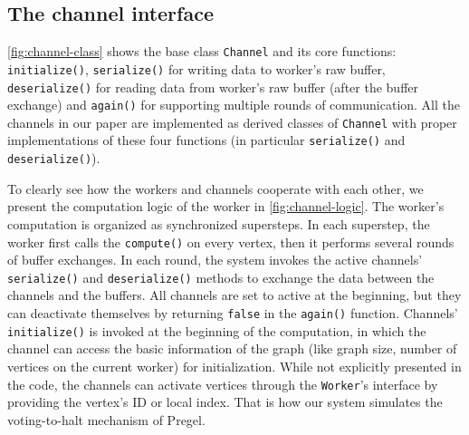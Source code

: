 \documentclass{sokendai_thesis} %
\begin{document}

\subsection{The channel interface}

\autoref{fig:channel-class} shows the base class \texttt{Channel} and its core functions: \texttt{initialize()}, \texttt{serialize()} for writing data to worker's raw buffer, \texttt{deserialize()} for reading data from worker's raw buffer (after the buffer exchange) and \texttt{again()} for supporting multiple rounds of communication.
All the channels in our paper are implemented as derived classes of \texttt{Channel} with proper implementations of these four functions (in particular \texttt{serialize()} and \texttt{deserialize()}).

To clearly see how the workers and channels cooperate with each other, we present the computation logic of the worker in \autoref{fig:channel-logic}.
The worker's computation is organized as synchronized supersteps.
In each superstep, the worker first calls the \texttt{compute()} on every vertex, then it performs several rounds of buffer exchanges.
In each round, the system invokes the active channels' \texttt{serialize()} and \texttt{deserialize()} methods to exchange the data between the channels and the buffers.
All channels are set to active at the beginning, but they can deactivate themselves by returning \texttt{false} in the \texttt{again()} function.
Channels' \texttt{initialize()} is invoked at the beginning of the computation,
in which the channel can access the basic information of the graph (like graph size, number of vertices on the current worker) for initialization.
While not explicitly presented in the code, the channels can activate vertices through the \texttt{Worker}'s interface by providing the vertex's ID or local index.
That is how our system simulates the voting-to-halt mechanism of Pregel.
\end{document}
